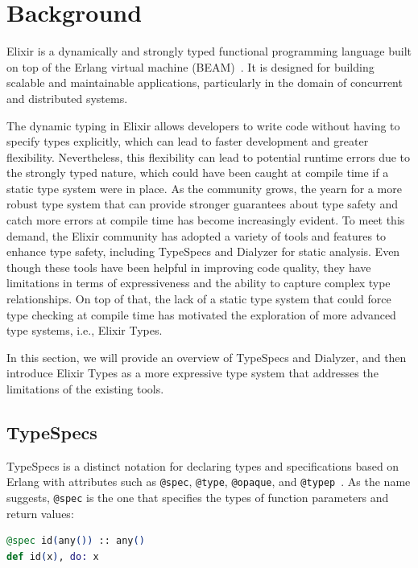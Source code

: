 \section{Background}

Elixir is a dynamically and strongly typed functional programming language built on top of the Erlang virtual machine (BEAM)~\cite{elixir-lang,erlang-armstrong}.
It is designed for building scalable and maintainable applications, particularly in the domain of concurrent and distributed systems.

The dynamic typing in Elixir allows developers to write code without having to specify types explicitly, which can lead to faster development and greater flexibility.
Nevertheless, this flexibility can lead to potential runtime errors due to the strongly typed nature, which could have been caught at compile time if a static type system were in place.
As the community grows, the yearn for a more robust type system that can provide stronger guarantees about type safety and catch more errors at compile time has become increasingly evident.
To meet this demand, the Elixir community has adopted a variety of tools and features to enhance type safety, including TypeSpecs and Dialyzer for static analysis.
Even though these tools have been helpful in improving code quality, they have limitations in terms of expressiveness and the ability to capture complex type relationships.
On top of that, the lack of a static type system that could force type checking at compile time has motivated the exploration of more advanced type systems, i.e., Elixir Types.

In this section, we will provide an overview of TypeSpecs and Dialyzer, and then introduce Elixir Types as a more expressive type system that addresses the limitations of the existing tools.

\subsection{TypeSpecs}
TypeSpecs is a distinct notation for declaring types and specifications based on Erlang with attributes such as \texttt{@spec}, \texttt{@type}, \texttt{@opaque}, and \texttt{@typep}~\cite{elixir-typespecs,erlang-typespecs}.
As the name suggests, \texttt{@spec} is the one that specifies the types of function parameters and return values:

\begin{lstlisting}[language=Elixir, firstnumber=last]
@spec id(any()) :: any()
def id(x), do: x
\end{lstlisting}


